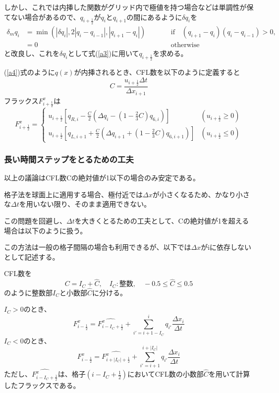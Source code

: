 \documentclass{jsbook}
\begin{document}
しかし、これでは内挿した関数がグリッド内で極値を持つ場合などは単調性が保てない場合があるので、$q_{i+\frac{1}{2}}$が$q_{i}$と$q_{i+1}$の間にあるように$\delta q_{i}$を
\begin{equation}
  \begin{aligned}
    \delta_{m} q_{i} & =\min(|\delta
    q_{i}|,2|q_{i}-q_{i-1}|,|q_{i+1}-q_{i}|) && \qquad \text{if$\quad(q_{i+1}-q_{i})(q_{i}-q_{i-1}) >0$}, \\
    & =0 && \qquad \text{otherwise}
  \end{aligned}
\end{equation}
と改良し、これを$\delta q_{i}$として式(\ref{a3})に用いて$q_{i+\frac{1}{2}}$を求める。

(\ref{a4})式のように$q(x)$が内挿されるとき、CFL数を以下のように定義すると
\begin{equation}
  C=\frac{u_{i+\frac{1}{2}}\Delta t}{\Delta x_{i+1}}
\end{equation}
フラックス$F^{x}_{i+\frac{1}{2}}$は
\begin{equation}
  F^{x}_{i+\frac{1}{2}}=\begin{cases}u_{i+\frac{1}{2}}[q_{R,i}-\frac{C}{2}(\Delta q_{i}-(1-\frac{2}{3}C)q_{6,i})] & (u_{i+\frac{1}{2}}\ge0)\\
  u_{i+\frac{1}{2}}[q_{L,i+1}+\frac{C}{2}(\Delta q_{i+1}+(1-\frac{2}{3}C)q_{6,i+1})] & (u_{i+\frac{1}{2}}\leq0)
  \end{cases}
\end{equation}
\subsubsection{長い時間ステップをとるための工夫}
以上の議論はCFL数Cの絶対値が1以下の場合のみ安定である。

格子法を球面上に適用する場合、極付近では$\Delta x$が小さくなるため、かなり小さな$\Delta t$を用いない限り、そのまま適用できない。

この問題を回避し、$\Delta t$を大きくとるための工夫として、Cの絶対値が1を超える場合は以下のように扱う。

この方法は一般の格子間隔の場合も利用できるが、以下では$\Delta x$がiに依存しないとして記述する。

CFL数を
\begin{equation}
  C=I_{C}+\hat{C},\quad I_{C}:整数,\quad -0.5\le \hat{C} \le 0.5
\end{equation}
のように整数部$I_{C}$と小数部$\hat{C}$に分ける。

$I_{C}>0$のとき、
\begin{equation}
  F^{x}_{i-\frac{1}{2}}=\hat{F^{x}_{i-I_{C}+\frac{1}{2}}}+\sum^{i}_{i'=i+1-I_{C}} q_{i'} \frac{\Delta x_{i}}{\Delta t}
\end{equation}
$I_{C}<0$のとき、
\begin{equation}
  F^{x}_{i-\frac{1}{2}}=\hat{F^{x}_{i+|I_{C}|+\frac{1}{2}}}+\sum^{i+|I_{C}|}_{i'=i+1} q_{i'} \frac{\Delta x_{i}}{\Delta t}
\end{equation}
ただし、$\hat{F^{x}_{i-I_{C}+\frac{1}{2}}}$は、格子$(i-I_{C}+\frac{1}{2})$においてCFL数の小数部$\hat{C}$を用いて計算したフラックスである。
\end{document}
